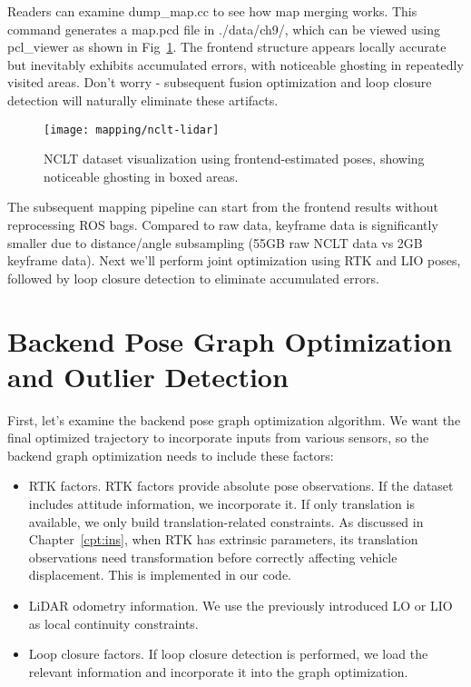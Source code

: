 Readers can examine dump_map.cc to see how map merging works. This command generates a map.pcd file in ./data/ch9/, which can be viewed using pcl_viewer as shown in Fig~\ref{fig:nclt-frontend}. The frontend structure appears locally accurate but inevitably exhibits accumulated errors, with noticeable ghosting in repeatedly visited areas. Don't worry - subsequent fusion optimization and loop closure detection will naturally eliminate these artifacts.

\begin{figure}
	\centering
	\texttt{[image: mapping/nclt-lidar]}
	\caption{NCLT dataset visualization using frontend-estimated poses, showing noticeable ghosting in boxed areas.}
	\label{fig:nclt-frontend}
\end{figure}

The subsequent mapping pipeline can start from the frontend results without reprocessing ROS bags. Compared to raw data, keyframe data is significantly smaller due to distance/angle subsampling (55GB raw NCLT data vs 2GB keyframe data). Next we'll perform joint optimization using RTK and LIO poses, followed by loop closure detection to eliminate accumulated errors.

\section{Backend Pose Graph Optimization and Outlier Detection}
First, let's examine the backend pose graph optimization algorithm. We want the final optimized trajectory to incorporate inputs from various sensors, so the backend graph optimization needs to include these factors:
\begin{itemize}
	\item RTK factors. RTK factors provide absolute pose observations. If the dataset includes attitude information, we incorporate it. If only translation is available, we only build translation-related constraints. As discussed in Chapter~\ref{cpt:ins}, when RTK has extrinsic parameters, its translation observations need transformation before correctly affecting vehicle displacement. This is implemented in our code.
	\item LiDAR odometry information. We use the previously introduced LO or LIO as local continuity constraints.
	\item Loop closure factors. If loop closure detection is performed, we load the relevant information and incorporate it into the graph optimization.
\end{itemize}

